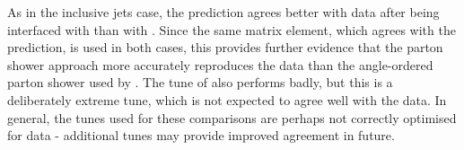 As in the inclusive jets case, the \Powheg prediction agrees better with data
after being interfaced with \Pythia than with \Herwig. Since the same matrix
element, which agrees with the \NLOjetpp prediction, is used in both cases, this
provides further evidence that the \Pythia parton shower approach more
accurately reproduces the data than the angle-ordered parton shower used by
\Herwig. The \Perugia tune of \Pythia also performs badly, but this is a deliberately
extreme tune, which is not expected to agree well with the data. In general, the
\Herwig tunes used for these comparisons are perhaps not correctly optimised for
\LHC data - additional tunes may provide improved agreement in future.


